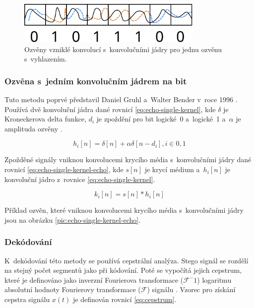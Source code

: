 \begin{figure}[hbt]
    \centering
    \includegraphics[width=0.8\textwidth]{obrazky/echo-smoothed.pdf}
    \caption{Ozvěny vzniklé konvolucí s~konvolučními jádry pro jednu ozvěnu
    s~vyhlazením.}
    \label{pic:echo-single-kernel-echo-smooth}
\end{figure}

\subsubsection*{Ozvěna s~jedním konvolučním jádrem na bit}
\label{ssub:echo-single-kernel}

Tuto metodu poprvé představil Daniel Gruhl a~Walter Bender v~roce 1996
\cite{Gruhl1996}. Používá dvě konvoluční jádra dané rovnicí
\ref{eq:echo-single-kernel}, kde $\delta$ je Kroneckerova delta funkce, $d_i$
je zpoždění pro bit logické~0 a~logické~1 a~$\alpha$ je amplituda ozvěny
\cite{Dutta2020}.

\begin{equation}
    \label{eq:echo-single-kernel}
    h_i[n] = \delta[n] + \alpha\delta[n - d_i], i \in {0, 1}
\end{equation}

\noindent Zpožděné signály vniknou konvolucemi krycího média s~konvolučními
jádry dané rovnicí \ref{eq:echo-single-kernel-echo}, kde $s[n]$ je krycí médium
a~$h_i[n]$ je konvoluční jádro z~rovnice \ref{eq:echo-single-kernel}.

\begin{equation}
    \label{eq:echo-single-kernel-echo}
    k_i[n] = s[n] * h_i[n]
\end{equation}

\noindent Příklad ozvěn, které vniknou konvolucemi krycího média s~konvolučními
jádry jsou na obrázku \ref{pic:echo-single-kernel-echo}.

\subsubsection*{Dekódování}
\label{ssub:echo-single-kernel-decoding}

K~dekódování této metody se používá cepstrální analýza. Stego signál se rozdělí
na stejný počet segmentů jako při kódování. Poté se vypočítá jejich cepstrum,
které je definováno jako inverzní Fourierova transformace ($\mathcal{F}^-1$)
logaritmu absolutní hodnoty Fourierovy transformace ($\mathcal{F}$) signálu
\cite{Tekeli2017}. Vzorec pro získání cepstra signálu $x(t)$ je definován
rovnicí \ref{eq:cepstrum}.

